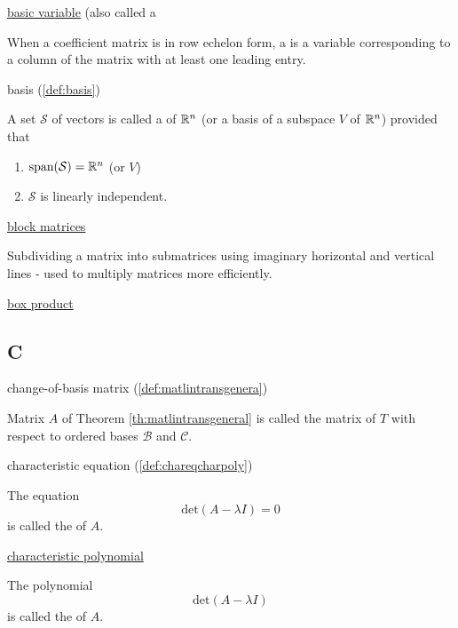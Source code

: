 \documentclass{ximera}
\begin{document}
\href{https://ximera.osu.edu/linearalgebradzv3/LinearAlgebraInteractiveIntro/SYS-0020/main}{basic variable} (also called a 
\begin{expandable}{}{}
    When a coefficient matrix is in row echelon form, a  is a variable corresponding to a column of the matrix with at least one leading entry.
\end{expandable}

basis (\ref{def:basis})
\begin{expandable}{}{}
    A set $\mathcal{S}$ of vectors is called a  of $\mathbb{R}^n$ (or a basis of a subspace $V$ of $\mathbb{R}^n$) provided that 
\begin{enumerate}
\item 
$\mbox{span}(\mathcal{S})=\mathbb{R}^n$ (or $V$)
\item 
$\mathcal{S}$ is linearly independent.
\end{enumerate}
\end{expandable}


\href{https://ximera.osu.edu/linearalgebradzv3/LinearAlgebraInteractiveIntro/MAT-0023/main}{block matrices}
\begin{expandable}{}{}
    Subdividing a matrix into submatrices using imaginary horizontal and vertical lines - used to multiply matrices more efficiently.
\end{expandable}

\href{https://ximera.osu.edu/linearalgebradzv3/LinearAlgebraInteractiveIntro/DET-0070/main}{box product}

\subsection*{C}

change-of-basis matrix (\ref{def:matlintransgenera})
\begin{expandable}{}{}
    Matrix $A$ of Theorem \ref{th:matlintransgeneral} is called the matrix of $T$ with respect to ordered bases $\mathcal{B}$ and $\mathcal{C}$.
\end{expandable}

characteristic equation (\ref{def:chareqcharpoly})
\begin{expandable}{}{}
    The equation 
$$\mbox{det}(A-\lambda I) = 0$$ is called the  of $A$. 
\end{expandable}

\href{https://ximera.osu.edu/linearalgebradzv3/LinearAlgebraInteractiveIntro/EIG-0020/main}{characteristic polynomial}
\begin{expandable}{}{}
    The polynomial 
$$\mbox{det}(A-\lambda I)$$ is called the  of $A$. 
\end{expandable}
\end{document}
